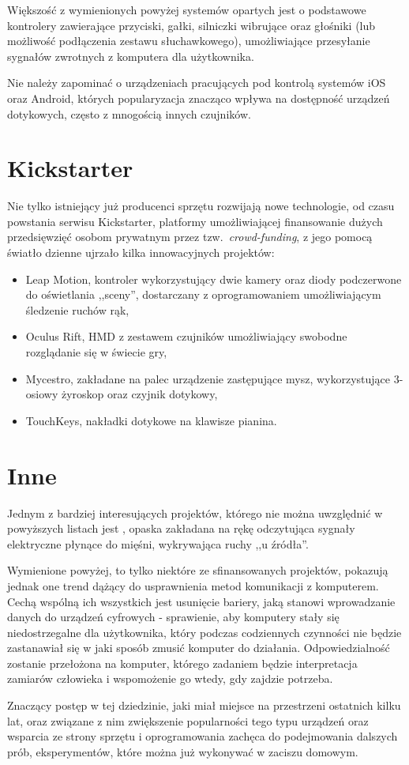Większość z wymienionych powyżej systemów opartych jest o podstawowe kontrolery zawierające przyciski, gałki, silniczki wibrujące oraz głośniki (lub możliwość podłączenia zestawu słuchawkowego), umożliwiające przesyłanie sygnałów zwrotnych z komputera dla użytkownika.

Nie należy zapominać o urządzeniach pracujących pod kontrolą systemów iOS oraz Android, których popularyzacja znacząco wpływa na dostępność urządzeń dotykowych, często z mnogością innych czujników.\\

\section{Kickstarter}

Nie tylko istniejący już producenci sprzętu rozwijają nowe technologie, od czasu powstania serwisu Kickstarter, platformy umożliwiającej finansowanie dużych przedsięwzięć osobom prywatnym przez tzw.\ \textit{crowd-funding}, z jego pomocą światło dzienne ujrzało kilka innowacyjnych projektów:
\begin{itemize}
 \item Leap Motion, kontroler wykorzystujący dwie kamery oraz diody podczerwone do oświetlania ,,sceny'', dostarczany z oprogramowaniem umożliwiającym śledzenie ruchów rąk,
 \item Oculus Rift, HMD z zestawem czujników umożliwiający swobodne rozglądanie się w świecie gry,
 \item Mycestro, zakładane na palec urządzenie zastępujące mysz, wykorzystujące 3-osiowy żyroskop oraz czyjnik dotykowy,
 \item TouchKeys, nakładki dotykowe na klawisze pianina.\\
\end{itemize}

\section{Inne}

Jednym z bardziej interesujących projektów, którego nie można uwzględnić w powyższych listach jest , opaska zakładana na rękę odczytująca sygnały elektryczne płynące do mięśni, wykrywająca ruchy ,,u źródła''.

Wymienione powyżej, to tylko niektóre ze sfinansowanych projektów, pokazują jednak one trend dążący do usprawnienia metod komunikacji z komputerem. Cechą wspólną ich wszystkich jest usunięcie bariery, jaką stanowi wprowadzanie danych do urządzeń cyfrowych - sprawienie, aby komputery stały się niedostrzegalne dla użytkownika, który podczas codziennych czynności nie będzie zastanawiał się w jaki sposób zmusić komputer do działania. Odpowiedzialność zostanie przełożona na komputer, którego zadaniem będzie interpretacja zamiarów człowieka i wspomożenie go wtedy, gdy zajdzie potrzeba.

Znaczący postęp w tej dziedzinie, jaki miał miejsce na przestrzeni ostatnich kilku lat, oraz związane z nim zwiększenie popularności tego typu urządzeń oraz wsparcia ze strony sprzętu i oprogramowania zachęca do podejmowania dalszych prób, eksperymentów, które można już wykonywać w zaciszu domowym.
